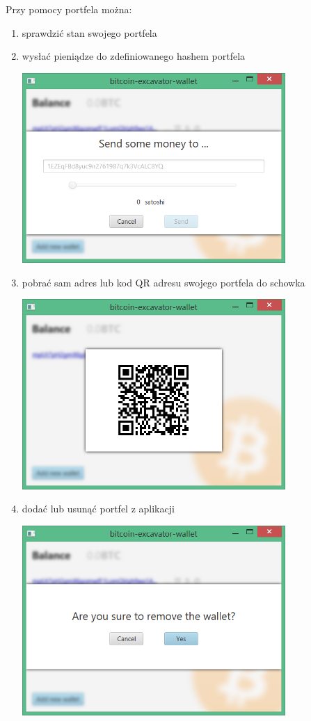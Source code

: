 \documentclass[11pt,a4paper]{article}
\begin{document}
Przy pomocy portfela można:
\begin{enumerate}
 \item sprawdzić stan swojego portfela
 \item wysłać pieniądze do zdefiniowanego hashem portfela
 
       \includegraphics[width=10cm]{images/wallet_send_screen.PNG}
 \item pobrać sam adres lub kod QR adresu swojego portfela do schowka
 
       \includegraphics[width=10cm]{images/wallet_qr_screen.PNG}
 \item dodać lub usunąć portfel z aplikacji
 
       \includegraphics[width=10cm]{images/wallet_remove_screen.PNG}
\end{enumerate}
\end{document}
